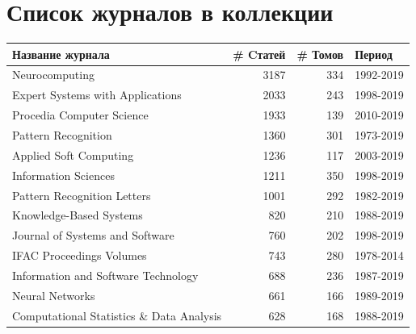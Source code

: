 \documentclass[12pt]{article}
\begin{document}
\section{Список журналов в коллекции}
\label{appendix:journals}
\begin{center}
	\def\arraystretch{0.8}
	{\small
		\begin{longtable}{lrrl}
			\toprule
			Название журнала                                                                     & \# Cтатей & \# Томов & Период    \\
			\midrule			 
			\endhead
			Neurocomputing                                                                       &      3187 &      334 & 1992-2019 \\
			Expert Systems with Applications                                                     &      2033 &      243 & 1998-2019 \\
			Procedia Computer Science                                                            &      1933 &      139 & 2010-2019 \\
			Pattern Recognition                                                                  &      1360 &      301 & 1973-2019 \\
			Applied Soft Computing                                                               &      1236 &      117 & 2003-2019 \\
			Information Sciences                                                                 &      1211 &      350 & 1998-2019 \\
			Pattern Recognition Letters                                                          &      1001 &      292 & 1982-2019 \\
			Knowledge-Based Systems                                                              &       820 &      210 & 1988-2019 \\
			Journal of Systems and Software                                                      &       760 &      202 & 1998-2019 \\
			IFAC Proceedings Volumes                                                             &       743 &      280 & 1978-2014 \\
			Information and Software Technology                                                  &       688 &      236 & 1987-2019 \\
			Neural Networks                                                                      &       661 &      166 & 1989-2019 \\
			Computational Statistics \& Data Analysis                                            &       628 &      168 & 1988-2019 \\

\end{longtable}}
\end{center}
\end{document}
